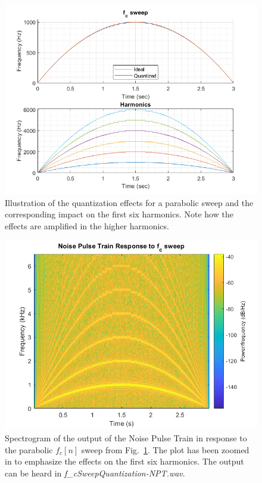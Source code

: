 \documentclass[../main.tex]{subfiles}
\begin{document}
\begin{figure}[h]
    \centering
    \includegraphics[scale=.65]{./images/plots/f_cSweepQuantized.png}
    \caption{Illustration of the quantization effects for a parabolic sweep and the corresponding impact on the first six harmonics. Note how the effects are amplified in the higher harmonics.}
    \label{fig:f_cSweepQuantized}
\end{figure}

\begin{figure}[h]
    \centering
    \includegraphics[scale=.65]{./images/plots/f_cSweepNPT.png}
    \caption{Spectrogram of the output of the Noise Pulse Train in response to the parabolic $f_c[n]$ sweep from Fig.~\ref{fig:f_cSweepQuantized}. The plot has been zoomed in to emphasize the effects on the first six harmonics. The output can be heard in \emph{f\_cSweepQuantization-NPT.wav}.}
    \label{fig:f_cQuantizedSpectrum}
\end{figure}
\end{document}
